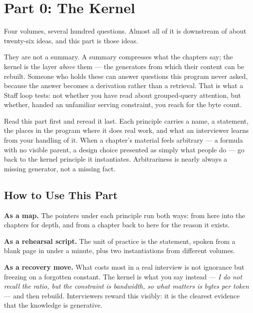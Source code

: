 \chapter*{Part 0: The Kernel}

Four volumes, several hundred questions. Almost all of it is downstream of about twenty-six ideas, and this part is those ideas.

They are not a summary. A summary compresses what the chapters say; the kernel is the layer \emph{above} them --- the generators from which their content can be rebuilt. Someone who holds these can answer questions this program never asked, because the answer becomes a derivation rather than a retrieval. That is what a Staff loop tests: not whether you have read about grouped-query attention, but whether, handed an unfamiliar serving constraint, you reach for the byte count.

\begin{tldr}
Read this part first and reread it last. Each principle carries a name, a statement, the places in the program where it does real work, and what an interviewer learns from your handling of it. When a chapter's material feels arbitrary --- a formula with no visible parent, a design choice presented as simply what people do --- go back to the kernel principle it instantiates. Arbitrariness is nearly always a missing generator, not a missing fact.
\end{tldr}

\section*{How to Use This Part}

\textbf{As a map.} The pointers under each principle run both ways: from here into the chapters for depth, and from a chapter back to here for the reason it exists.

\textbf{As a rehearsal script.} The unit of practice is the statement, spoken from a blank page in under a minute, plus two instantiations from different volumes.

\textbf{As a recovery move.} What costs most in a real interview is not ignorance but freezing on a forgotten constant. The kernel is what you say instead --- \emph{I do not recall the ratio, but the constraint is bandwidth, so what matters is bytes per token} --- and then rebuild. Interviewers reward this visibly: it is the clearest evidence that the knowledge is generative.

